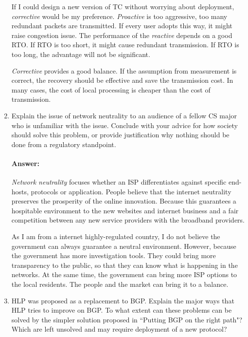 \documentclass[a4paper,11pt]{article}
\theoremstyle{mytheor}
\begin{document}
\begin{enumerate}
If I could design a new version of TC without worrying about deployment, 
\emph{corrective} would be my preference.
\emph{Proactive} is too aggressive, too many redundant packets are transmitted.
If every user adopts this way, it might raise congestion issue.
The performance of the \emph{reactive} depends on a good RTO.
If RTO is too short, it might cause redundant transmission.
If RTO is too long, the advantage will not be significant.

\emph{Corrective} provides a good balance.
If the assumption from measurement is correct, the recovery should be effective and save the transmission cost.
In many cases, the cost of local processing is cheaper than the cost of transmission.


\item
Explain the issue of network neutrality to an audience of a fellow CS major who is unfamiliar with the issue.
Conclude with your advice for how society should solve this problem, or provide justification why nothing should be done from a regulatory standpoint.
\paragraph{Answer:}
\emph{Network neutrality} focuses whether an ISP differentiates against specific end-hosts, protocols or application.
People believe that the internet neutrality preserves the prosperity of the online innovation.
Because this guarantees a hospitable environment to the new websites and internet business and a fair competition between any new service providers with the broadband providers.

As I am from a internet highly-regulated country, I do not believe the government can always guarantee a neutral environment.
However, because the government has more investigation tools. 
They could bring more transparency to the public, so that they can know what is happening in the networks.
At the same time, the government can bring more ISP options to the local residents.
The people and the market can bring it to a balance.

\item
HLP was proposed as a replacement to BGP. 
Explain the major ways that HLP tries to improve on BGP. 
To what extent can these problems can be solved by the simpler solution proposed in ``Putting BGP on the
right path"? 
Which are left unsolved and may require deployment of a new protocol?

\end{enumerate}
\end{document}
